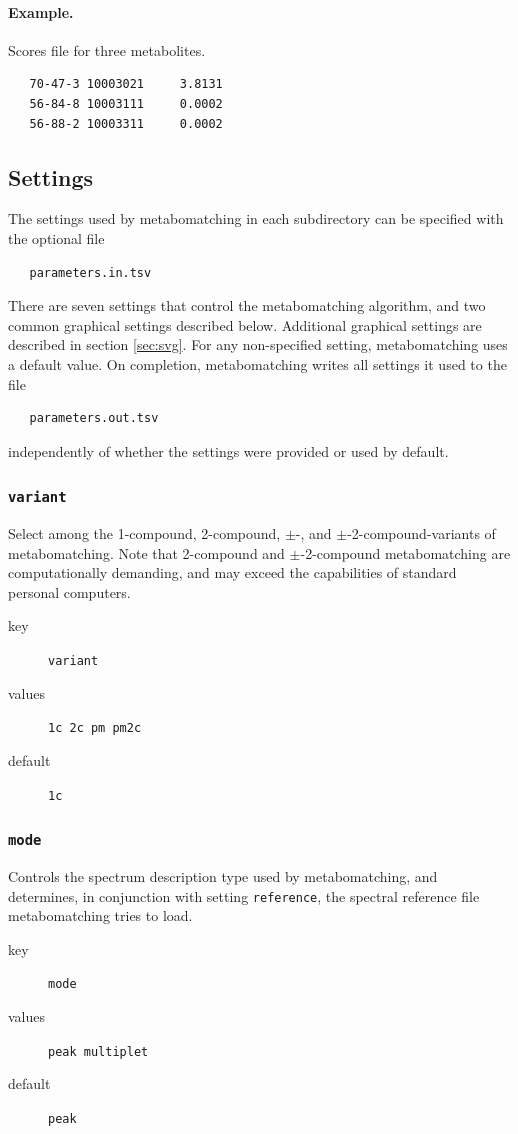 \documentclass[a4paper,11pt]{article}
\begin{document}
\paragraph{Example.} Scores file for three metabolites.
\begin{verbatim}
   70-47-3 10003021     3.8131
   56-84-8 10003111     0.0002
   56-88-2 10003311     0.0002
\end{verbatim}
\subsection{Settings\label{sec:settings}}
The settings used by metabomatching in each subdirectory can be specified with the optional file
\begin{verbatim}
   parameters.in.tsv
\end{verbatim}
There are seven settings that control the metabomatching algorithm, and two common graphical settings described below. Additional graphical settings are described in section \ref{sec:svg}. For any non-specified setting, metabomatching uses a default value. On completion, metabomatching writes all settings it used to the file
\begin{verbatim}
   parameters.out.tsv
\end{verbatim}
independently of whether the settings were provided or used by default.
\subsubsection{ \texttt{variant}}
Select among the 1-compound, 2-compound, $\pm$-, and $\pm$-2-compound-variants of metabomatching. Note that 2-compound and $\pm$-2-compound metabomatching are computationally demanding, and may exceed the capabilities of standard personal computers.
\begin{description}
\item[key] \texttt{variant}
\item[values] \texttt{1c 2c pm pm2c}
\item[default] \texttt{1c}
\end{description}
\subsubsection{ \texttt{mode}}
Controls the spectrum description type used by metabomatching, and determines, in conjunction with setting \texttt{reference}, the spectral reference file metabomatching tries to load.
\begin{description}
	\item[key] \texttt{mode}
	\item[values] \texttt{peak multiplet}
	\item[default] \texttt{peak}
\end{description}
\end{document}
